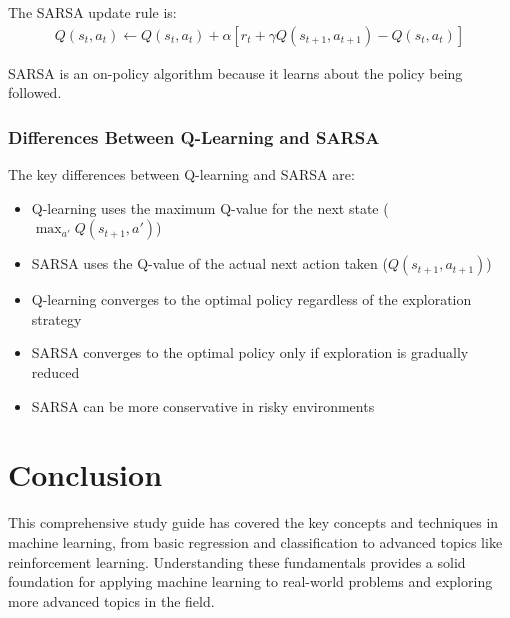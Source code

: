 \documentclass{article}
\begin{document}
The SARSA update rule is:
\begin{align}
Q(s_t, a_t) \leftarrow Q(s_t, a_t) + \alpha\left[r_t + \gamma Q(s_{t+1}, a_{t+1}) - Q(s_t, a_t)\right]
\end{align}

SARSA is an on-policy algorithm because it learns about the policy being followed.

\subsubsection{Differences Between Q-Learning and SARSA}
The key differences between Q-learning and SARSA are:
\begin{itemize}
\item Q-learning uses the maximum Q-value for the next state ($\max_{a'}Q(s_{t+1}, a')$)
\item SARSA uses the Q-value of the actual next action taken ($Q(s_{t+1}, a_{t+1})$)
\item Q-learning converges to the optimal policy regardless of the exploration strategy
\item SARSA converges to the optimal policy only if exploration is gradually reduced
\item SARSA can be more conservative in risky environments
\end{itemize}

\section{Conclusion}
This comprehensive study guide has covered the key concepts and techniques in machine learning, from basic regression and classification to advanced topics like reinforcement learning. Understanding these fundamentals provides a solid foundation for applying machine learning to real-world problems and exploring more advanced topics in the field.
\end{document}
